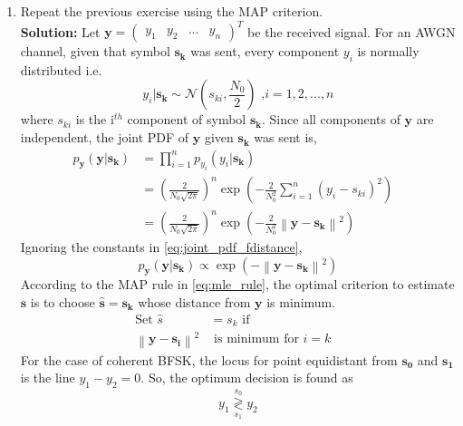 \documentclass[journal,8pt,onecolumn]{IEEEtran}
\providecommand{\mbf}{\mathbf}
\providecommand{\norm}[1]{\left\lVert#1\right\rVert}
\newcommand{\solution}{\noindent \textbf{Solution: }}
\providecommand{\dec}[2]{\ensuremath{\overset{#1}{\underset{#2}{\gtrless}}}}
\newcommand{\myvec}[1]{\ensuremath{\begin{pmatrix}#1\end{pmatrix}}}
\providecommand{\gauss}[2]{\mathcal{N}\ensuremath{\left(#1,#2\right)}}
\let\vec\mathbf
\begin{document}
\begin{enumerate}
\solution The decision rule is
\begin{equation}
y_1 \dec{s_0}{s_1} y_2
\end{equation}
\item
Repeat the previous exercise using the MAP criterion.\\
\solution Let $\mbf{y} = \myvec{y_1&y_2&...&y_n}^T$ be the received signal. For an AWGN channel, given that symbol $\mbf{s_k}$ was sent, %
every component $y_i$ is normally distributed i.e. 
\begin{equation}
y_i|\mbf{s_k} \sim \gauss{s_{ki}}{\frac{N_0}{2}}\text{   ,} i=1,2,...,n 
\end{equation}
where $s_{ki}$ is the i$^{th}$ component of symbol $\mbf{s_k}$. Since all components of $\mbf{y}$ are independent, the joint PDF of $\mbf{y}$ given %
$\mbf{s_k}$ was sent is,
\begin{align}
	p_{\mbf{y}}(\mbf{y}|\mbf{s_k}) &= \prod\limits_{i=1}^{n} p_{y_i}(y_i|\mbf{s_k})&\\
	&= \left(\frac{2}{N_0\sqrt{2\pi}}\right)^n \exp\left(-\frac{2}{N_0^2}\sum\limits_{i=1}^{n} (y_i-s_{ki})^2\right)\\
	\label{eq:joint_pdf_fdistance}
	&= \left(\frac{2}{N_0\sqrt{2\pi}}\right)^n \exp\left(-\frac{2}{N_0^2}\norm{\vec{y}-\vec{s_k}}^2\right)
\end{align}
Ignoring the constants in \eqref{eq:joint_pdf_fdistance},
\begin{equation}
	p_{\mbf{y}}(\mbf{y}|\mbf{s_k}) \propto \exp\left(-\norm{\vec{y}-\vec{s_k}}^2\right)
\end{equation}
According to the MAP rule in \eqref{eq:mle_rule}, the optimal criterion to estimate $\vec{s}$ is to choose $\vec{\hat{s}}=\vec{s_k}$ whose
distance from $\vec{y}$ is minimum.
\begin{align}
	\label{eq:AWGN_est_rule}
	\text{Set } \hat{s} &= s_k \text{ if}&\\ \nonumber
	\norm{\vec{y}-\vec{s_i}}^2 & \text{ is minimum for } i = k
\end{align}
For the case of coherent BFSK, the locus for point equidistant from $\vec{s_0}$ and $\vec{s_1}$ is the line $y_1-y_2=0$. So, the optimum
decision is found as 
\begin{equation}
y_1 \dec{s_0}{s_1} y_2
\end{equation}


\end{enumerate}
\end{document}
